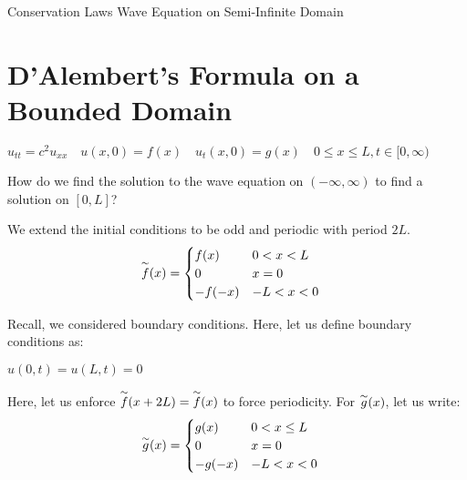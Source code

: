 \documentclass{article}
\begin{document}
{Conservation Laws}
{Wave Equation on Semi-Infinite Domain}
\newpage

\section{D'Alembert's Formula on a Bounded Domain}
\begin{center}
  $
  u_{tt} = c^2 u_{xx} \quad
  u(x, 0) = f(x) \quad
  u_t(x, 0) = g(x) \quad
  0 \leq x \leq L, t \in [0, \infty)
  $
\end{center}

How do we find the solution to the wave equation on
$(-\infty, \infty)$
to find a solution on $[0, L]$?

We extend the initial conditions to be odd and periodic with period $2L$.
%
\begin{align}
  \overset{\sim}{f}(x) & =
  \begin{cases}
    f(x) & 0 < x < L\\
    0 & x = 0\\
    -f(-x) & -L < x < 0
  \end{cases}
\end{align}

Recall, we considered boundary conditions. Here, let us define boundary conditions as:
\begin{center}
  $u(0, t) = u(L, t) = 0$
\end{center}

Here, let us enforce $\overset{\sim}{f}(x + 2L) = \overset{\sim}{f}(x)$ to force periodicity. For $\overset{\sim}{g}(x)$, let us write:
%
\begin{align}
  \overset{\sim}{g}(x) & =
  \begin{cases}
    g(x) & 0 < x \leq L\\
    0 & x = 0\\
    -g(-x) & -L < x < 0
  \end{cases}
\end{align}
\end{document}

